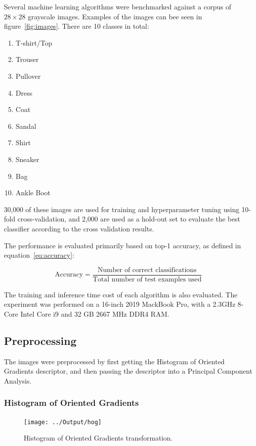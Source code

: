 \documentclass[landscape,twocolumn]{article}
\begin{document}
Several machine learning algorithms were benchmarked against a corpus of $28 \times 28$ grayscale images. Examples of the images can bee seen in figure~\ref{fig:images}. There are 10 classes in total:
\begin{enumerate}
	\item T-shirt/Top
	\item Trouser
	\item Pullover
	\item Dress
	\item Coat
	\item Sandal
	\item Shirt
	\item Sneaker
	\item Bag
	\item Ankle Boot
\end{enumerate}

30,000 of these images are used for training and hyperparameter tuning using 10-fold cross-validation, and 2,000 are used as a hold-out set to evaluate the best classifier according to the cross validation results.

The performance is evaluated primarily based on top-1 accuracy, as defined in equation~\ref{eq:accuracy}:

\begin{equation}
	\label{eq:accuracy}
	\text{Accuracy} = \frac{\text{Number of correct classifications}}{\text{Total number of test examples used}}
\end{equation}

The training and inference time cost of each algorithm is also evaluated. The experiment was performed on a 16-inch 2019 MackBook Pro, with a 2.3GHz 8-Core Intel Core i9 and 32 GB 2667 MHz DDR4 RAM\@.

\subsection{Preprocessing}
The images were preprocessed by first getting the Histogram of Oriented Gradients descriptor, and then passing the descriptor into a Principal Component Analysis.

\subsubsection{Histogram of Oriented Gradients}
\begin{figure}[ht]
	\texttt{[image: ../Output/hog]}
	\caption{Histogram of Oriented Gradients transformation.}\label{fig:hog}
\end{figure}
\end{document}
